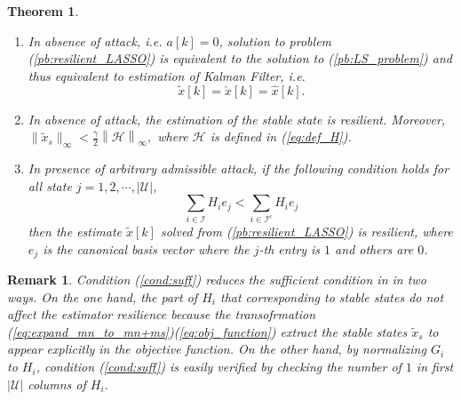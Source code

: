 \documentclass[12pt]{article}
\newcommand{\Cc}{{\mathcal{C}}}
\newcommand{\I}{{\mathcal{I}}}
\newcommand{\Uc}{{\mathcal{U}}}
\newcommand{\Hc}{{\mathcal{H}}}
\newtheorem{theorem}{\textbf{Theorem}}
\newtheorem{remark}{\textbf{Remark}}
\begin{document}
\begin{theorem}
	\leavevmode
	\begin{enumerate}
		\item In absence of attack, i.e. $a[k]=0$, solution to problem (\ref{pb:resilient_LASSO}) is equivalent to the solution to (\ref{pb:LS_problem}) and thus equivalent to estimation of Kalman Filter, i.e.
		\begin{equation*}
			\tilde{x}[k]=\check{x}[k]=\hat{x}[k].
		\end{equation*}
	\item In absence of attack, the estimation of the stable state is resilient. Moreover,
	$\|\tilde{x}_s\|_\infty<\frac{\gamma}{2}
	\left\|\Hc\right\|_\infty,$ where $\Hc$ is defined in (\ref{eq:def_H}).
	
	\item In presence of arbitrary admissible attack, if the following condition holds for all state $j=1,2,\cdots,|\Uc|$,
	\begin{equation}\label{cond:suff}
		\sum_{i\in\I} H_{i} e_j < \sum_{i\in\I^c} H_{i} e_j
	\end{equation}
	then the estimate $\tilde{x}[k]$ solved from (\ref{pb:resilient_LASSO}) is resilient,
	where $e_j$ is the canonical basis vector where the $j$-th entry is $1$ and others are $0$.
	\end{enumerate}
\end{theorem}

\begin{remark}
	Condition (\ref{cond:suff}) reduces the sufficient condition in \cite{liuxinghua-IFAC}\cite{handuo_tac} in two ways.
	On the one hand, the part of $H_i$ that corresponding to stable states do not affect the estimator resilience because the transofrmation (\ref{eq:expand_mn_to_mn+ms})(\ref{eq:obj_function}) extract the stable states $\tilde{x}_s$ to appear explicitly in the objective function.
	On the other hand, by normalizing $G_i$ to $H_i$, condition (\ref{cond:suff}) is easily verified by checking the number of $1$ in first $|\Uc|$ columns of $H_i$.
\end{remark}
\end{document}

